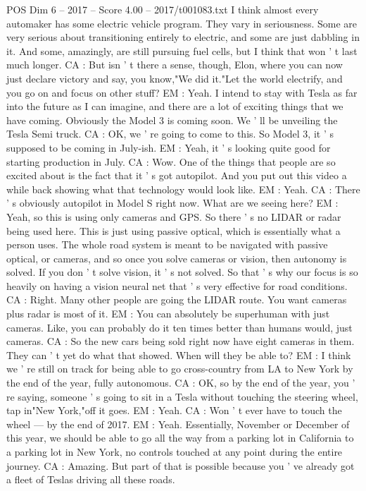 \begin{textsample}{POS Dim 6 – 2017 – Score 4.00 – 2017/t001083.txt}
I think almost every automaker has some electric vehicle program.
They vary in seriousness.
Some are very serious about transitioning entirely to electric, and some are just dabbling in it.
And some, amazingly, are still pursuing fuel cells, but I think that won ' t last much longer.
CA : But isn ' t there a sense, though, Elon, where you can now just declare victory and say, you know,"We did it."Let the world electrify, and you go on and focus on other stuff?
EM : Yeah.
I intend to stay with Tesla as far into the future as I can imagine, and there are a lot of exciting things that we have coming.
Obviously the Model 3 is coming soon.
We ' ll be unveiling the Tesla Semi truck.
CA : OK, we ' re going to come to this.
So Model 3, it ' s supposed to be coming in July-ish.
EM : Yeah, it ' s looking quite good for starting production in July.
CA : Wow.
One of the things that people are so excited about is the fact that it ' s got autopilot.
And you put out this video a while back showing what that technology would look like.
EM : Yeah.
CA : There ' s obviously autopilot in Model S right now.
What are we seeing here?
EM : Yeah, so this is using only cameras and GPS.
So there ' s no LIDAR or radar being used here.
This is just using passive optical, which is essentially what a person uses.
The whole road system is meant to be navigated with passive optical, or cameras, and so once you solve cameras or vision, then autonomy is solved.
If you don ' t solve vision, it ' s not solved.
So that ' s why our focus is so heavily on having a vision neural net that ' s very effective for road conditions.
CA : Right.
Many other people are going the LIDAR route.
You want cameras plus radar is most of it.
EM : You can absolutely be superhuman with just cameras.
Like, you can probably do it ten times better than humans would, just cameras.
CA : So the new cars being sold right now have eight cameras in them.
They can ' t yet do what that showed.
When will they be able to?
EM : I think we ' re still on track for being able to go cross-country from LA to New York by the end of the year, fully autonomous.
CA : OK, so by the end of the year, you ' re saying, someone ' s going to sit in a Tesla without touching the steering wheel, tap in"New York,"off it goes.
EM : Yeah.
CA : Won ' t ever have to touch the wheel — by the end of 2017.
EM : Yeah.
Essentially, November or December of this year, we should be able to go all the way from a parking lot in California to a parking lot in New York, no controls touched at any point during the entire journey.
CA : Amazing.
But part of that is possible because you ' ve already got a fleet of Teslas driving all these roads.

\end{textsample}
